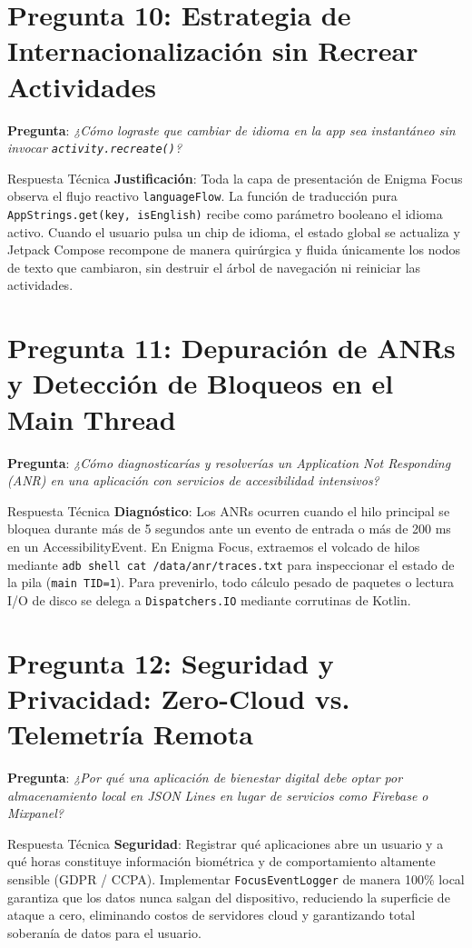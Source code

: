 \documentclass[11pt,a4paper,oneside]{report}
\begin{document}
\section{Pregunta 10: Estrategia de Internacionalización sin Recrear Actividades}
\textbf{Pregunta}: \textit{¿Cómo lograste que cambiar de idioma en la app sea instantáneo sin invocar \texttt{activity.recreate()}?}
\begin{starbox}{Respuesta Técnica}
\textbf{Justificación}: Toda la capa de presentación de Enigma Focus observa el flujo reactivo \texttt{languageFlow}. La función de traducción pura \texttt{AppStrings.get(key, isEnglish)} recibe como parámetro booleano el idioma activo. Cuando el usuario pulsa un chip de idioma, el estado global se actualiza y Jetpack Compose recompone de manera quirúrgica y fluida únicamente los nodos de texto que cambiaron, sin destruir el árbol de navegación ni reiniciar las actividades.
\end{starbox}

\newpage

\section{Pregunta 11: Depuración de ANRs y Detección de Bloqueos en el Main Thread}
\textbf{Pregunta}: \textit{¿Cómo diagnosticarías y resolverías un Application Not Responding (ANR) en una aplicación con servicios de accesibilidad intensivos?}
\begin{starbox}{Respuesta Técnica}
\textbf{Diagnóstico}: Los ANRs ocurren cuando el hilo principal se bloquea durante más de 5 segundos ante un evento de entrada o más de 200 ms en un AccessibilityEvent. En Enigma Focus, extraemos el volcado de hilos mediante \texttt{adb shell cat /data/anr/traces.txt} para inspeccionar el estado de la pila (\texttt{main TID=1}). Para prevenirlo, todo cálculo pesado de paquetes o lectura I/O de disco se delega a \texttt{Dispatchers.IO} mediante corrutinas de Kotlin.
\end{starbox}

\section{Pregunta 12: Seguridad y Privacidad: Zero-Cloud vs. Telemetría Remota}
\textbf{Pregunta}: \textit{¿Por qué una aplicación de bienestar digital debe optar por almacenamiento local en JSON Lines en lugar de servicios como Firebase o Mixpanel?}
\begin{starbox}{Respuesta Técnica}
\textbf{Seguridad}: Registrar qué aplicaciones abre un usuario y a qué horas constituye información biométrica y de comportamiento altamente sensible (GDPR / CCPA). Implementar \texttt{FocusEventLogger} de manera 100\% local garantiza que los datos nunca salgan del dispositivo, reduciendo la superficie de ataque a cero, eliminando costos de servidores cloud y garantizando total soberanía de datos para el usuario.
\end{starbox}
\end{document}
